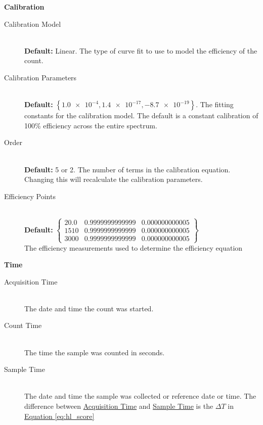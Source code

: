 \documentclass[12pt,report,justified]{SANDreport}
\begin{document}
\begin{center}
{\large \textbf{Calibration}}
\end{center}
\begin{description}
\item[Calibration Model] \label{itm:cal_model} \hfill \\
\textbf{Default:} Linear. The type of curve fit to use to model the efficiency of the count.
\item[Calibration Parameters] \label{itm:cal_coeff} \hfill \\
\textbf{Default:} \( \left\{ \num{1.0e-4}, \num{1.4e-17}, \num{-8.7e-19}  \right\}\). The fitting constants for the
calibration model. The default is a constant calibration of 100\% efficiency across the entire
spectrum.
\item[Order] \label{itm:cal_order} \hfill \\
 \textbf{Default:} 5 or 2. The number of terms in the calibration equation. Changing this will recalculate
the calibration parameters.
\item[Efficiency Points] \label{itm:eff_pts} \hfill \\
 \textbf{Default:} \(  
\left\{ \begin{matrix} 
20.0 & 0.9999999999999 & 0.000000000005 \\
1510 & 0.9999999999999 & 0.000000000005  \\ 
3000 & 0.9999999999999 & 0.000000000005 
 \end{matrix}
 \right\} \) \\ 
The efficiency measurements used to determine the efficiency equation
\end{description}

\begin{center}
{\large \textbf{Time}}
\end{center}
\begin{description}
\item[Acquisition Time] \label{itm:time_acq} \hfill \\
The date and time the count was started.
\item[Count Time] \label{itm:time_cnt} \hfill \\
The time the sample was counted in seconds.
\item[Sample Time] \label{itm:time_smp} \hfill \\
The date and time the sample was collected or reference date or time. The difference between
\hyperref[itm:time_acq]{Acquisition Time} and \hyperref[itm:time_cnt]{Sample Time} is the 
\(\Delta T\) in \hyperref[eq:hl_score]{Equation \ref{eq:hl_score}}
\end{description}
\end{document}
